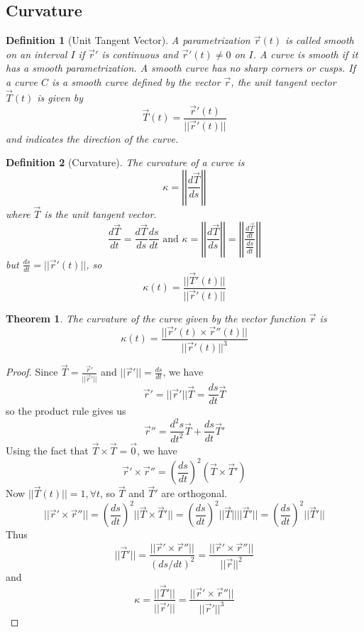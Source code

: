 \documentclass[10pt]{report}
\newtheorem{thm3}{Theorem}[subsection]
\newtheorem{def3}{Definition}[subsection]
\begin{document}
\subsection{Curvature}
\begin{def3}[Unit Tangent Vector]
A parametrization $\vec{r}(t)$ is called smooth on an interval $I$ if $\vec{r}'$ is continuous and $\vec{r}'(t)\neq 0$ on $I$. A curve is smooth if it has a smooth parametrization. A smooth curve has no sharp corners or cusps.
If a curve $C$ is a smooth curve defined by the vector $\vec{r}$, the unit tangent vector $\vec{T}(t)$ is given by
$$\vec{T}(t) = \frac{\vec{r}'(t)}{||\vec{r}'(t)||}$$
and indicates the direction of the curve.
\end{def3}
\begin{def3}[Curvature]
The curvature of a curve is
$$\kappa = \left|\left|\frac{d\vec{T}}{ds}\right|\right|$$
where $\vec{T}$ is the unit tangent vector.
$$\frac{d\vec{T}}{dt}=\frac{d\vec{T}}{ds}\frac{ds}{dt} \text{  and  } \kappa = \left|\left|\frac{d\vec{T}}{ds}\right|\right| = \left|\left|\frac{\frac{d\vec{T}}{dt}}{\frac{ds}{dt}}\right|\right|$$
but $\frac{ds}{dt}=||\vec{r}'(t)||$, so
$$\kappa(t) = \frac{||\vec{T}'(t)||}{||\vec{r}'(t)||}$$
\end{def3}
\begin{thm3}
The curvature of the curve given by the vector function $\vec{r}$ is
$$\kappa (t) = \frac{||\vec{r}'(t) \times \vec{r}''(t)||}{||\vec{r}'(t)||^3}$$
\end{thm3}
\begin{proof}
Since $\vec{T}=\frac{\vec{r}'}{||\vec{r}'||}$ and $||\vec{r}'|| = \frac{ds}{dt}$, we have 
$$\vec{r}' = ||\vec{r}'||\vec{T} = \frac{ds}{dt}\vec{T}$$
so the product rule gives us
$$\vec{r}'' = \frac{d^2s}{dt^2}\vec{T} + \frac{ds}{dt}\vec{T}'$$
Using the fact that $\vec{T}\times \vec{T} = \vec{0}$, we have
$$\vec{r}' \times \vec{r}'' = \left( \frac{ds}{dt}\right) ^2 (\vec{T}\times \vec{T}')$$
Now $||\vec{T}(t)|| = 1, \forall t$, so $\vec{T}$ and $\vec{T}'$ are orthogonal.
$$||\vec{r}' \times \vec{r}''|| = \left( \frac{ds}{dt}\right) ^2 ||\vec{T}\times \vec{T}'|| = \left( \frac{ds}{dt}\right) ^2 ||\vec{T}||||\vec{T}'|| = \left( \frac{ds}{dt}\right) ^2 ||\vec{T}'||$$
Thus
$$||\vec{T}'|| = \frac{||\vec{r}'\times \vec{r}''||}{(ds/dt)^2} = \frac{||\vec{r}' \times \vec{r}''||}{||\vec{r}||^2}$$
and
$$\kappa = \frac{||\vec{T}'||}{||\vec{r}'||} = \frac{||\vec{r}' \times \vec{r}''||}{||\vec{r}'||^3}$$ 
\end{proof}
\end{document}
